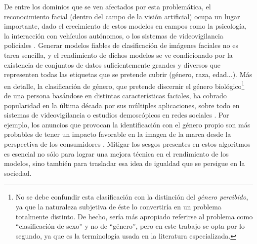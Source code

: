 De entre los dominios que se ven afectados por esta problemática, el reconocimiento facial (dentro del campo de la visión artificial) ocupa un lugar importante, dado el crecimiento de estos modelos en campos como la psicología, la interacción con vehículos autónomos, o los sistemas de videovigilancia policiales \cite{agbo2019face,han2020toward}. Generar modelos fiables de clasificación de imágenes faciales no es tarea sencilla, y el rendimiento de dichos modelos se ve condicionado por la existencia de conjuntos de datos suficientemente grandes y diversos \cite{agbo2019face} que representen todas las etiquetas que se pretende cubrir (género, raza, edad...). Más en detalle, la clasificación de género, que pretende discernir el género biológico\footnote{No se debe confundir esta clasificación con la distinción del \textit{género percibido}, ya que la naturaleza subjetiva de éste lo convertiría en un problema totalmente distinto. De hecho, sería más apropiado referirse al problema como ``clasificación de sexo'' y no de ``género'', pero en este trabajo se opta por lo segundo, ya que es la terminología usada en la literatura especializada.} de una persona basándose en distintas características faciales, ha cobrado popularidad en la última década por sus múltiples aplicaciones, sobre todo en sistemas de videovigilancia o estudios demoscópicos en redes sociales \cite{poornima2021classification,nelson2019bias}. Por ejemplo, los anuncios que provocan la identificación con el género propio son más probables de tener un impacto favorable en la imagen de la marca desde la perspectiva de los consumidores \cite{wu2020gender}. Mitigar los sesgos presentes en estos algoritmos es esencial no sólo para lograr una mejora técnica en el rendimiento de los modelos, sino también para trasladar esa idea de igualdad que se persigue en la sociedad.

